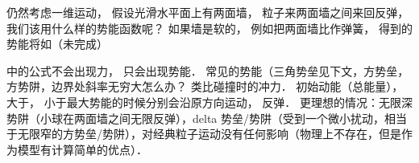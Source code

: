 

仍然考虑一维运动， 假设光滑水平面上有两面墙， 粒子来两面墙之间来回反弹， 我们该用什么样的势能函数呢？ 如果墙是软的， 例如把两面墙比作弹簧， 得到的势能将如（未完成）

中的公式不会出现力， 只会出现势能． 常见的势能（三角势垒见下文，方势垒，方势阱，边界处斜率无穷大怎么办？ 类比碰撞时的冲力． 初始动能（总能量）， 大于， 小于最大势能的时候分别会沿原方向运动， 反弹． 更理想的情况：无限深势阱（小球在两面墙之间无限反弹），delta 势垒/势阱（受到一个微小扰动，相当于无限窄的方势垒/势阱），对经典粒子运动没有任何影响（物理上不存在，但是作为模型有计算简单的优点）．
